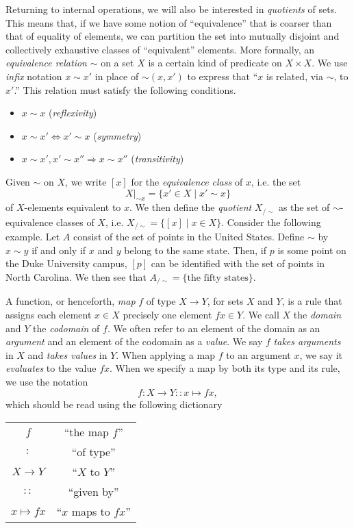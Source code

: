 Returning to internal operations, we will also be interested in \emph{quotients} of sets. This means that, if we have some notion of ``equivalence'' that is coarser than that of equality of elements, we can partition the set into mutually disjoint and collectively exhaustive classes of ``equivalent'' elements. More formally, an \emph{equivalence relation} $\sim$ on a set $X$ is a certain kind of predicate on $X\times X$. We use \emph{infix} notation $x\sim x'$ in place of $\sim(x,x')$ to express that ``$x$ is related, via $\sim$, to $x'$.'' This relation must satisfy the following conditions.
\begin{itemize}
    \item $x\sim x$ (\emph{reflexivity})
    \item $x\sim x' \Leftrightarrow x'\sim x$ (\emph{symmetry})
    \item $x\sim x',x'\sim x''\Rightarrow x\sim x''$ (\emph{transitivity})
\end{itemize}
Given $\sim$ on $X$, we write $[x]$ for the \emph{equivalence class} of $x$, i.e. the set 
\[X|_{\sim x}=\{x'\in X\mid x'\sim x\}\] 
of $X$-elements equivalent to $x$. We then define the \emph{quotient} $X_{/\sim}$ as the set of $\sim$-equivalence classes of $X$, i.e. $X_{/\sim}=\{[x]\mid x\in X\}$. Consider the following example. Let $A$ consist of the set of points in the United States. Define $\sim$ by $x\sim y$ if and only if $x$ and $y$ belong to the same state. Then, if $p$ is some point on the Duke University campus, $[p]$ can be identified with the set of points in North Carolina. We then see that $A_{/\sim}=\{\text{the fifty states}\}$.

A function, or henceforth, \emph{map} $f$ of type $X\to Y$, for sets $X$ and $Y$, is a rule that assigns each element $x\in X$ precisely one element $fx\in Y$. We call $X$ the \emph{domain} and $Y$ the \emph{codomain} of $f$. We often refer to an element of the domain as an \emph{argument} and an element of the codomain as a \emph{value}. We say $f$ \emph{takes arguments} in $X$ and \emph{takes values} in $Y$. When applying a map $f$ to an argument $x$, we say it \emph{evaluates} to the value $fx$. When we specify a map by both its type and its rule, we use the notation
\[f:X\to Y::x\mapsto fx,\]
which should be read using the following dictionary
\begin{table}[h]
    \centering
    \begin{tabular}{c||c}
        $f$ & ``the map $f$'' \\
        $:$ & ``of type'' \\
        $X\to Y$ & ``$X$ to $Y$'' \\
        $::$ & ``given by'' \\
        $x\mapsto fx$ & ``$x$ maps to $fx$''
    \end{tabular}
\end{table}


